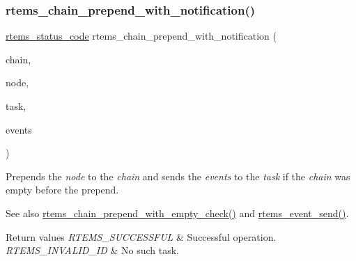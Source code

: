 \subsubsection{\texorpdfstring{rtems\_chain\_prepend\_with\_notification()}{rtems\_chain\_prepend\_with\_notification()}}
{\footnotesize\ttfamily \mbox{\hyperlink{group__ClassicStatus_ga545d41846817eaba6143d52ee4d9e9fe}{rtems\+\_\+status\+\_\+code}} rtems\+\_\+chain\+\_\+prepend\+\_\+with\+\_\+notification (\begin{DoxyParamCaption}\item[{\mbox{\hyperlink{unionChain__Control}{rtems\+\_\+chain\+\_\+control}} $\ast$}]{chain,  }\item[{\mbox{\hyperlink{structChain__Node__struct}{rtems\+\_\+chain\+\_\+node}} $\ast$}]{node,  }\item[{\mbox{\hyperlink{group__ClassicTasks_gab20892b814dced7dd4e5b9bf42becd57}{rtems\+\_\+id}}}]{task,  }\item[{\mbox{\hyperlink{group__ClassicEventSet_gab7b8f373bea85fd4e3b7ae23905faa07}{rtems\+\_\+event\+\_\+set}}}]{events }\end{DoxyParamCaption})}



Prepends the {\itshape node} to the {\itshape chain} and sends the {\itshape events} to the {\itshape task} if the {\itshape chain} was empty before the prepend. 

\begin{DoxySeeAlso}{See also}
\mbox{\hyperlink{group__ClassicChains_gaac656ee126f96d8f5a45c68927ea13d2}{rtems\+\_\+chain\+\_\+prepend\+\_\+with\+\_\+empty\+\_\+check()}} and \mbox{\hyperlink{group__ClassicEvent_ga2d31674c165127bc530178d06d557b94}{rtems\+\_\+event\+\_\+send()}}.
\end{DoxySeeAlso}

\begin{DoxyRetVals}{Return values}
{\em R\+T\+E\+M\+S\+\_\+\+S\+U\+C\+C\+E\+S\+S\+F\+UL} & Successful operation. \\
\hline
{\em R\+T\+E\+M\+S\+\_\+\+I\+N\+V\+A\+L\+I\+D\+\_\+\+ID} & No such task. \\
\hline
\end{DoxyRetVals}
\mbox{\label{group__ClassicChains_gaafcbf989d0d2e360aadd0d304a0f30e3}} 
